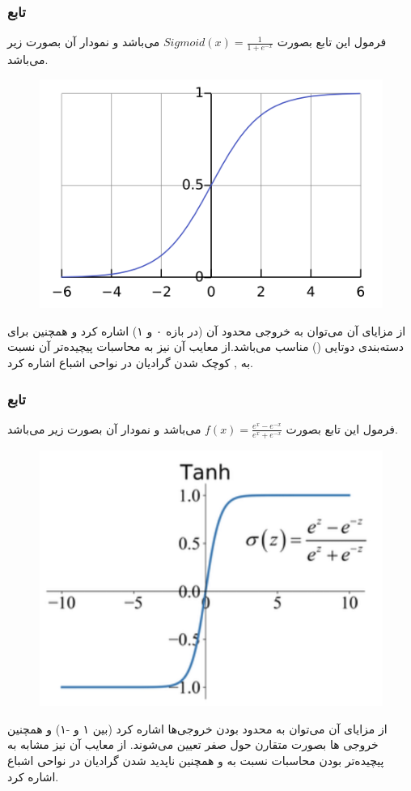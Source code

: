 \documentclass[12pt]{article}
\begin{document}
	\subsubsection{تابع }
	فرمول این تابع بصورت $Sigmoid(x) = \frac{1}{1+e^{-x}}$ می‌باشد و نمودار آن بصورت زیر می‌باشد.
	\begin{figure}[H]
		\centering
		\includegraphics[scale=0.5]{pic_2.png}
	\end{figure}
	از مزایای آن می‌توان به خروجی محدود آن (در بازه ۰ و ۱) اشاره کرد و همچنین برای دسته‌بندی دوتایی () مناسب می‌باشد.از معایب آن نیز به محاسبات پیچیده‌تر آن نسبت به  , کوچک شدن گرادیان در نواحی اشباع اشاره کرد.
	\subsubsection{تابع }
	فرمول این تابع بصورت $f(x) = \frac{e^{x} - e^{-x}}{e^{x} + e^{-x}}$ می‌باشد و نمودار آن بصورت زیر می‌باشد.
	\begin{figure}[H]
		\centering
		\includegraphics{pic_3.png}
	\end{figure}
	از مزایای آن می‌توان به محدود بودن خروجی‌ها اشاره کرد (بین ۱ و -۱) و همچنین خروجی ها بصورت متقارن حول صفر تعیین می‌شوند. از معایب آن نیز مشابه  به پیچیده‌تر بودن محاسبات نسبت به  و همچنین ناپدید شدن گرادیان در نواحی اشباع اشاره کرد.
\end{document}
